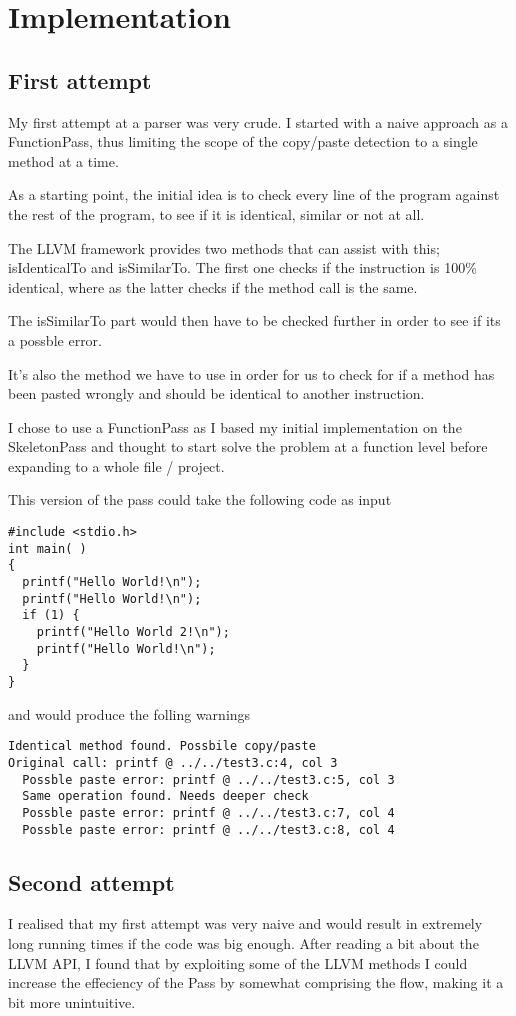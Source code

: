 \documentclass[a4paper,11pt]{article}
\theoremstyle{mytheor}
\begin{document}
\section*{Implementation}

\subsection*{First attempt}
My first attempt at a parser was very crude.
I started with a naive approach as a FunctionPass, thus limiting the scope of the copy/paste detection to a single method at a time.

As a starting point, the initial idea is to check every line of the program against the rest of the program, to see if it is identical, similar or not at all.

The LLVM framework provides two methods that can assist with this; isIdenticalTo and isSimilarTo.
The first one checks if the instruction is 100\% identical, where as the latter checks if the method call is the same.

The isSimilarTo part would then have to be checked further in order to see if its a possble error.

It's also the method we have to use in order for us to check for if a method has been pasted wrongly and should be identical to another instruction.

I chose to use a FunctionPass as I based my initial implementation on the SkeletonPass and thought to start solve the problem at a function level before expanding to a whole file / project.

This version of the pass could take the following code as input
\begin{verbatim}
#include <stdio.h>
int main( )
{
  printf("Hello World!\n");
  printf("Hello World!\n");
  if (1) {
    printf("Hello World 2!\n");
    printf("Hello World!\n");
  }
}
\end{verbatim}

and would produce the folling warnings
\begin{verbatim}
Identical method found. Possbile copy/paste
Original call: printf @ ../../test3.c:4, col 3
  Possble paste error: printf @ ../../test3.c:5, col 3
  Same operation found. Needs deeper check
  Possble paste error: printf @ ../../test3.c:7, col 4
  Possble paste error: printf @ ../../test3.c:8, col 4
\end{verbatim}

\subsection*{Second attempt}
I realised that my first attempt was very naive and would result in extremely long running times if the code was big enough.
After reading a bit about the LLVM API, I found that by exploiting some of the LLVM methods I could increase the effeciency of the Pass by somewhat comprising the flow, making it a bit more unintuitive.
\end{document}
